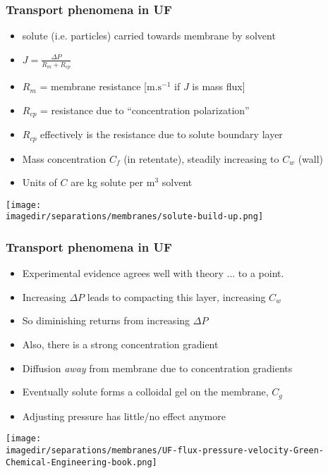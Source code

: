 \begin{frame}\frametitle{Transport phenomena in UF}
	\begin{itemize}		
		\item	solute (i.e. particles) carried towards membrane by solvent
		\item	$J = \displaystyle\frac{\Delta P}{R_m + R_{cp}}$
		\item	$R_m$ = membrane resistance [$\text{m.s}^{-1}$ if $J$ is mass flux] 
		\item	$R_{cp}$ = resistance due to ``concentration polarization''
		\item	$R_{cp}$ effectively is the resistance due to solute boundary layer
		\item	Mass concentration $C_f$ (in retentate), steadily increasing to $C_w$ (wall)
		\item	Units of $C$ are kg solute per m$^3$ solvent
	\end{itemize}
	\begin{center}
		\texttt{[image: \\imagedir/separations/membranes/solute-build-up.png]}
	\end{center}
\end{frame}

\begin{frame}\frametitle{Transport phenomena in UF}
	\begin{itemize}
		\item	Experimental evidence agrees well with theory ... to a point.
		\item	Increasing $\Delta P$ leads to compacting this layer, increasing $C_w$
		\item	So diminishing returns from increasing $\Delta P$
		\item	Also, there is a strong concentration gradient
		\item	Diffusion \emph{away} from membrane due to concentration gradients		
		\item	Eventually solute forms a colloidal gel on the membrane, $C_g$
		\item	Adjusting pressure has little/no effect anymore
	\end{itemize}
	\begin{center}
		\texttt{[image: \\imagedir/separations/membranes/UF-flux-pressure-velocity-Green-Chemical-Engineering-book.png]}
	\end{center}
	\vspace{-12pt}
\end{frame}

